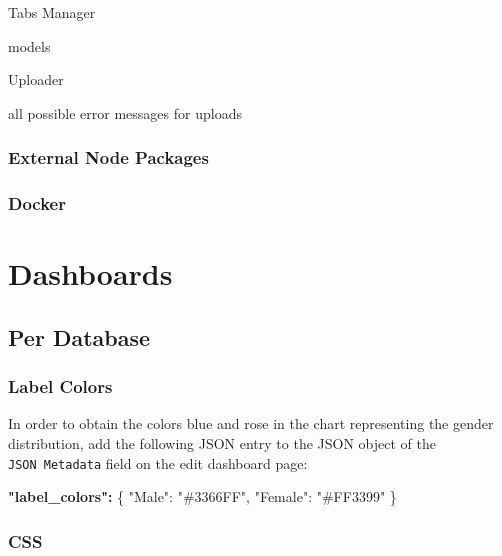 \documentclass[
]{book}
\newenvironment{Shaded}{\begin{snugshade}}{\end{snugshade}}
\newcommand{\DataTypeTok}[1]{\textcolor[rgb]{0.13,0.29,0.53}{#1}}
\newcommand{\ErrorTok}[1]{\textcolor[rgb]{0.64,0.00,0.00}{\textbf{#1}}}
\newcommand{\FunctionTok}[1]{\textcolor[rgb]{0.00,0.00,0.00}{#1}}
\newcommand{\StringTok}[1]{\textcolor[rgb]{0.31,0.60,0.02}{#1}}
\begin{document}
Tabs Manager

models

Uploader

all possible error messages for uploads

\hypertarget{external-node-packages}{%
\subsection*{External Node Packages}\label{external-node-packages}}

\hypertarget{docker}{%
\subsection*{Docker}\label{docker}}

\hypertarget{dashboards}{%
\chapter{Dashboards}\label{dashboards}}

\hypertarget{PerDatabaseDashboard}{%
\section{Per Database}\label{PerDatabaseDashboard}}

\hypertarget{label-colors}{%
\subsection*{Label Colors}\label{label-colors}}

In order to obtain the colors blue and rose in the chart representing the gender distribution,
add the following JSON entry to the JSON object of the \texttt{JSON\ Metadata} field on the edit dashboard page:

\begin{Shaded}
\begin{Highlighting}[]
\ErrorTok{"label\_colors":} \FunctionTok{\{}
    \DataTypeTok{"Male"}\FunctionTok{:} \StringTok{"\#3366FF"}\FunctionTok{,} 
    \DataTypeTok{"Female"}\FunctionTok{:} \StringTok{"\#FF3399"}
\FunctionTok{\}}
\end{Highlighting}
\end{Shaded}

\hypertarget{css}{%
\subsection*{CSS}\label{css}}
\end{document}
